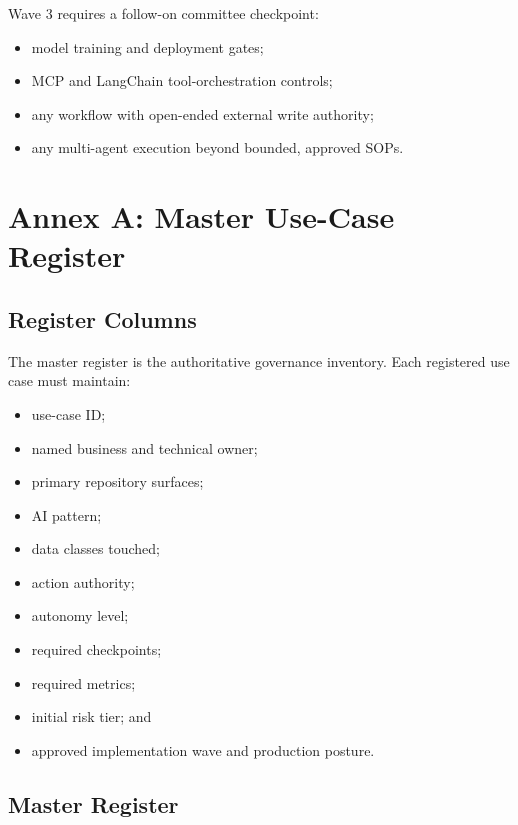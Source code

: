 \documentclass[11pt,a4paper]{article}
\begin{document}
Wave 3 requires a follow-on committee checkpoint:

\begin{itemize}[nosep]
    \item model training and deployment gates;
    \item MCP and LangChain tool-orchestration controls;
    \item any workflow with open-ended external write authority;
    \item any multi-agent execution beyond bounded, approved SOPs.
\end{itemize}

\section{Annex A: Master Use-Case Register}

\subsection{Register Columns}

The master register is the authoritative governance inventory. Each registered use case must maintain:

\begin{itemize}[nosep]
    \item use-case ID;
    \item named business and technical owner;
    \item primary repository surfaces;
    \item AI pattern;
    \item data classes touched;
    \item action authority;
    \item autonomy level;
    \item required checkpoints;
    \item required metrics;
    \item initial risk tier; and
    \item approved implementation wave and production posture.
\end{itemize}

\subsection{Master Register}
\end{document}
